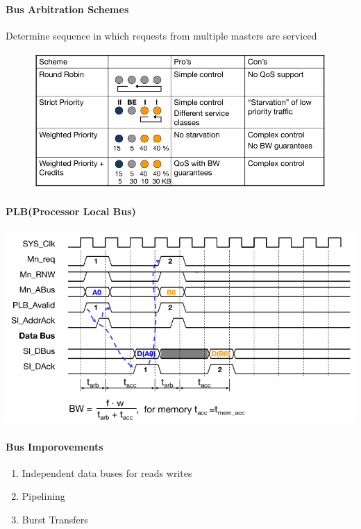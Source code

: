 \documentclass[english]{latex4ei/latex4ei_sheet}
\begin{document}
\paragraph{Bus Arbitration Schemes} Determine sequence in which requests from multiple masters are serviced
\begin{figure}
	\centering
	\includegraphics[width=\linewidth]{images//6.Interconnects/BusArbitrationSchemes.png}
\end{figure}

\paragraph{PLB(Processor Local Bus)}

\begin{center}
	\includegraphics[width=\linewidth]{images//6.Interconnects/PLBTiming.png}
\end{center}

\paragraph{Bus Imporovements}
\begin{enumerate}
	\item Independent data buses for reads writes
	\item Pipelining
	\item Burst Transfers
\end{enumerate}
\end{document}
